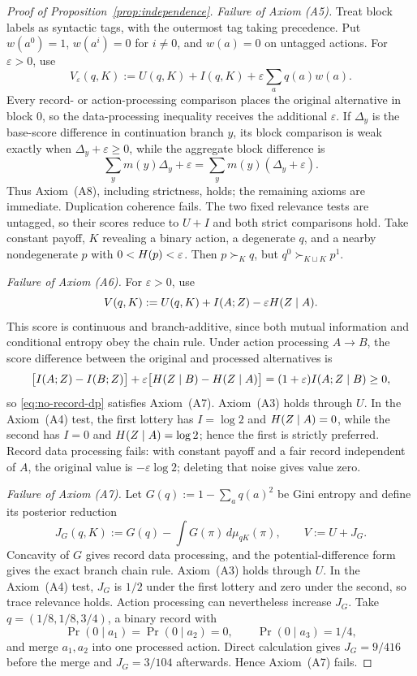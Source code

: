 \begin{proof}[Proof of Proposition~\ref{prop:independence}]
\emph{Failure of Axiom \textup{(A5)}.}
Treat block labels as syntactic tags, with the outermost tag taking precedence.  Put $w(a^0)=1$, $w(a^i)=0$ for
$i\ne0$, and $w(a)=0$ on untagged actions.  For $\varepsilon>0$, use
\[
 V_\varepsilon(q,K):=U(q,K)+I(q,K)+\varepsilon\sum_aq(a)w(a).
\]
Every record- or action-processing comparison places the original alternative in block $0$, so the data-processing
inequality receives the additional $\varepsilon$.  If $\Delta_y$ is the base-score difference in continuation branch
$y$, its block comparison is weak exactly when $\Delta_y+\varepsilon\ge0$, while the aggregate block difference is
\[
 \sum_y m(y)\Delta_y+\varepsilon
 =\sum_y m(y)(\Delta_y+\varepsilon).
\]
Thus Axiom~\textup{(A8)}, including strictness, holds; the remaining axioms are immediate.  Duplication coherence fails.
The two fixed relevance tests are untagged, so their scores reduce to $U+I$ and both strict comparisons hold.
Take constant payoff, $K$ revealing a binary action, a degenerate $q$, and a nearby nondegenerate $p$ with
$0<H(p)<\varepsilon$.  Then $p\succ_Kq$, but $q^0\succ_{K\sqcup K}p^1$.

\emph{Failure of Axiom \textup{(A6)}.}
For $\varepsilon>0$, use
\begin{equation}
 V(q,K):=U(q,K)+I(A;Z)-\varepsilon H(Z\mid A).
 \label{eq:no-record-dp}
\end{equation}
This score is continuous and branch-additive, since both mutual information and conditional entropy obey the chain
rule.  Under action processing $A\to B$, the score difference between the original and processed alternatives is
\[
 \bigl[I(A;Z)-I(B;Z)\bigr]
 +\varepsilon\bigl[H(Z\mid B)-H(Z\mid A)\bigr]
 =(1+\varepsilon)I(A;Z\mid B)\ge0,
\]
so \eqref{eq:no-record-dp} satisfies Axiom~\textup{(A7)}.  Axiom~\textup{(A3)} holds through $U$.  In the
Axiom~\textup{(A4)} test, the first lottery has $I=\log2$ and $H(Z\mid A)=0$, while the second has
$I=0$ and $H(Z\mid A)=\log2$; hence the first is strictly preferred.  Record data
processing fails: with constant payoff and a fair record independent of $A$, the original value is $-\varepsilon\log2$;
deleting that noise gives value zero.

\emph{Failure of Axiom \textup{(A7)}.}
Let $G(q):=1-\sum_aq(a)^2$ be Gini entropy and define its posterior reduction
\[
 J_G(q,K):=G(q)-\int G(\pi)\,d\mu_{qK}(\pi),
 \qquad V:=U+J_G.
\]
Concavity of $G$ gives record data processing, and the potential-difference form gives the exact branch chain rule.
Axiom~\textup{(A3)} holds through $U$.  In the Axiom~\textup{(A4)} test, $J_G$ is $1/2$ under the first
lottery and zero under the second, so trace relevance holds.  Action processing can nevertheless increase $J_G$.  Take
$q=(1/8,1/8,3/4)$, a binary record with
\[
 \Pr(0\mid a_1)=\Pr(0\mid a_2)=0,
 \qquad \Pr(0\mid a_3)=1/4,
\]
and merge $a_1,a_2$ into one processed action.  Direct calculation gives $J_G=9/416$ before the merge and
$J_G=3/104$ afterwards.  Hence Axiom~\textup{(A7)} fails.


\end{proof}
